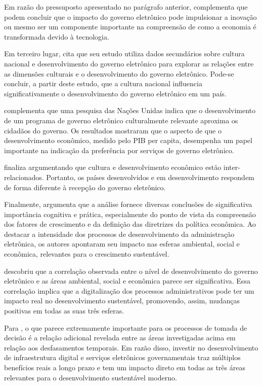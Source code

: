 Em razão do pressuposto apresentado no parágrafo anterior, \cite{kotenok2020government} complementa que podem concluir
que o impacto do governo eletrônico pode impulsionar a inovação ou
mesmo ser um componente importante na compreensão de como a
economia é transformada devido à tecnologia.

Em terceiro lugar, \cite{kumar2020cultural} cita que seu estudo utiliza dados secundários sobre cultura nacional e desenvolvimento do governo eletrônico para explorar as relações entre as dimensões culturais e o desenvolvimento do governo eletrônico. Pode-se concluir, a partir deste estudo, que a cultura nacional influencia significativamente o desenvolvimento do governo eletrônico em um país.

\cite{kumar2020cultural} complementa que uma pesquisa das Nações Unidas indica que o desenvolvimento de um programa de governo eletrônico culturalmente relevante aproxima os cidadãos do governo. Os resultados mostraram que o aspecto de que o desenvolvimento econômico, medido pelo PIB per capita, desempenha um papel importante na indicação da preferência por serviços de governo eletrônico.

\cite{kumar2020cultural} finaliza argumentando que cultura e desenvolvimento econômico estão inter-relacionados. Portanto, os países desenvolvidos e em desenvolvimento respondem de forma diferente à recepção do governo eletrônico.

Finalmente, \cite{ziolo2022government} argumenta que a análise fornece diversas conclusões de significativa importância cognitiva e prática, especialmente do ponto de vista da compreensão dos fatores de crescimento e da definição das diretrizes da política econômica. Ao destacar a intensidade dos processos de desenvolvimento da administração eletrônica, os autores apontaram seu impacto nas esferas ambiental, social e econômica, relevantes para o crescimento sustentável.

\cite{ziolo2022government} descobriu que a correlação observada entre o nível de desenvolvimento do governo eletrônico e as áreas ambiental, social e econômica parece ser significativa. Essa correlação implica que a digitalização dos processos administrativos pode ter um impacto real no desenvolvimento sustentável,
promovendo, assim, mudanças positivas em todas as suas três esferas.

Para \cite{ziolo2022government}, o que parece extremamente importante para os processos de tomada de decisão é a relação adicional revelada entre as áreas investigadas acima em relação aos desfasamentos temporais. Em razão disso,  investir no desenvolvimento de infraestrutura digital e serviços eletrônicos governamentais traz múltiplos benefícios reais a longo prazo e tem um impacto direto em todas as três áreas relevantes para o desenvolvimento sustentável moderno.

